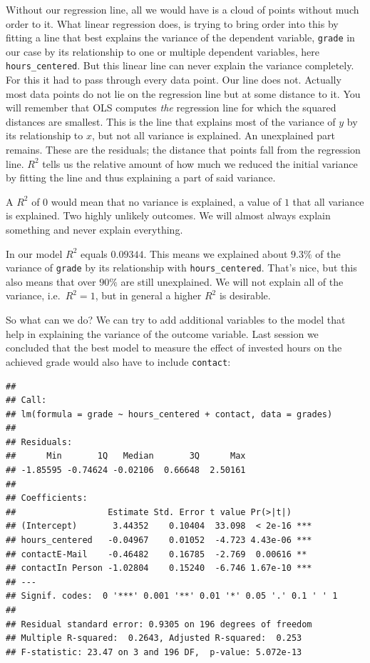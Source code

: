 \documentclass[
]{book}
\begin{document}
Without our regression line, all we would have is a cloud of points without much order to it. What linear regression does, is trying to bring order into this by fitting a line that best explains the variance of the dependent variable, \texttt{grade} in our case by its relationship to one or multiple dependent variables, here \texttt{hours\_centered}. But this linear line can never explain the variance completely. For this it had to pass through every data point. Our line does not. Actually most data points do not lie on the regression line but at some distance to it. You will remember that OLS computes \emph{the} regression line for which the squared distances are smallest. This is the line that explains most of the variance of \(y\) by its relationship to \(x\), but not all variance is explained. An unexplained part remains. These are the residuals; the distance that points fall from the regression line. \(R^2\) tells us the relative amount of how much we reduced the initial variance by fitting the line and thus explaining a part of said variance.

A \(R^2\) of \(0\) would mean that no variance is explained, a value of \(1\) that all variance is explained. Two highly unlikely outcomes. We will almost always explain something and never explain everything.

In our model \(R^2\) equals \(0.09344\). This means we explained about \(9.3\%\) of the variance of \texttt{grade} by its relationship with \texttt{hours\_centered}. That's nice, but this also means that over \(90\%\) are still unexplained. We will not explain all of the variance, i.e.~\(R^2 = 1\), but in general a higher \(R^2\) is desirable.

So what can we do? We can try to add additional variables to the model that help in explaining the variance of the outcome variable. Last session we concluded that the best model to measure the effect of invested hours on the achieved grade would also have to include \texttt{contact}:

\begin{verbatim}
## 
## Call:
## lm(formula = grade ~ hours_centered + contact, data = grades)
## 
## Residuals:
##      Min       1Q   Median       3Q      Max 
## -1.85595 -0.74624 -0.02106  0.66648  2.50161 
## 
## Coefficients:
##                  Estimate Std. Error t value Pr(>|t|)    
## (Intercept)       3.44352    0.10404  33.098  < 2e-16 ***
## hours_centered   -0.04967    0.01052  -4.723 4.43e-06 ***
## contactE-Mail    -0.46482    0.16785  -2.769  0.00616 ** 
## contactIn Person -1.02804    0.15240  -6.746 1.67e-10 ***
## ---
## Signif. codes:  0 '***' 0.001 '**' 0.01 '*' 0.05 '.' 0.1 ' ' 1
## 
## Residual standard error: 0.9305 on 196 degrees of freedom
## Multiple R-squared:  0.2643, Adjusted R-squared:  0.253 
## F-statistic: 23.47 on 3 and 196 DF,  p-value: 5.072e-13
\end{verbatim}
\end{document}
